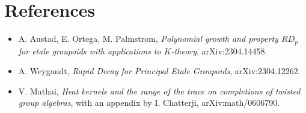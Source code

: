 \documentclass[11pt]{article}
\begin{document}
\section*{References}

\begin{itemize}
\item A. Austad, E. Ortega, M. Palmstrom, \emph{Polynomial growth and property
\(RD_p\) for etale groupoids with applications to \(K\)-theory},
arXiv:2304.14458.
\item A. Weygandt, \emph{Rapid Decay for Principal Etale Groupoids},
arXiv:2304.12262.
\item V. Mathai, \emph{Heat kernels and the range of the trace on completions
of twisted group algebras}, with an appendix by I. Chatterji,
arXiv:math/0606790.
\end{itemize}
\end{document}
